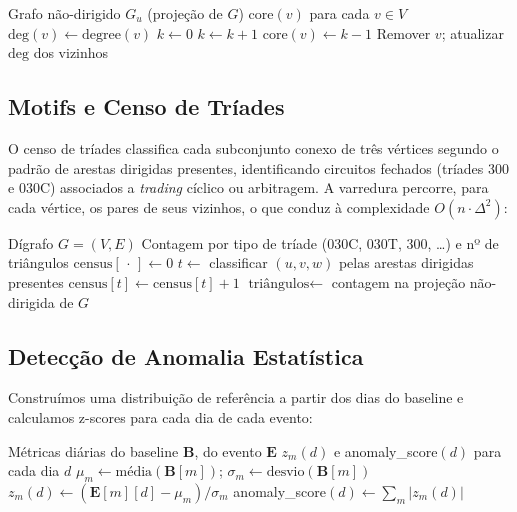 \documentclass[12pt,a4paper]{article}
\begin{document}
\begin{algorithm}[H]
\caption{K-core Decomposition}
\begin{algorithmic}[1]
\Require Grafo não-dirigido $G_u$ (projeção de $G$)
\Ensure $\text{core}(v)$ para cada $v \in V$
 $\text{deg}(v) \gets \text{degree}(v)$ \EndFor
\State $k \gets 0$
  \State $k \gets k + 1$
    \State $\text{core}(v) \gets k - 1$
    \State Remover $v$; atualizar $\text{deg}$ dos vizinhos
  \EndWhile
\EndWhile
\end{algorithmic}
\end{algorithm}

\subsection{Motifs e Censo de Tríades}

O censo de tríades classifica cada subconjunto conexo de três vértices segundo o padrão de arestas dirigidas presentes, identificando circuitos fechados (tríades 300 e 030C) associados a \textit{trading} cíclico ou arbitragem. A varredura percorre, para cada vértice, os pares de seus vizinhos, o que conduz à complexidade $O(n \cdot \Delta^2)$:

\begin{algorithm}[H]
\caption{Censo de Tríades e Contagem de Triângulos}
\begin{algorithmic}[1]
\Require Dígrafo $G=(V,E)$
\Ensure Contagem por tipo de tríade (030C, 030T, 300, \dots) e nº de triângulos
\State $\text{census}[\,\cdot\,] \gets 0$
    \State $t \gets$ classificar $(u,v,w)$ pelas arestas dirigidas presentes
    \State $\text{census}[t] \gets \text{census}[t] + 1$
  \EndFor
\EndFor
\State $\text{triângulos} \gets$ contagem na projeção não-dirigida de $G$
\end{algorithmic}
\end{algorithm}

\subsection{Detecção de Anomalia Estatística}

Construímos uma distribuição de referência a partir dos dias do baseline e calculamos z-scores para cada dia de cada evento:

\begin{algorithm}[H]
\caption{Detecção de Anomalia via Z-score}
\begin{algorithmic}[1]
\Require Métricas diárias do baseline $\mathbf{B}$, do evento $\mathbf{E}$
\Ensure $z_m(d)$ e anomaly\_score$(d)$ para cada dia $d$
  \State $\mu_m \gets \text{média}(\mathbf{B}[m])$; \quad $\sigma_m \gets \text{desvio}(\mathbf{B}[m])$
\EndFor
{}
    \State $z_m(d) \gets (\mathbf{E}[m][d] - \mu_m) / \sigma_m$
  \EndFor
  \State anomaly\_score$(d) \gets \sum_m |z_m(d)|$
\EndFor
\end{algorithmic}
\end{algorithm}
\end{document}

